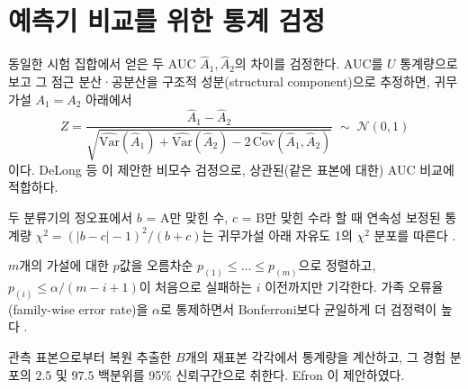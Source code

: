
\section{예측기 비교를 위한 통계 검정}
\label{sec:bg-stats}

\begin{definition}[DeLong 검정]
동일한 시험 집합에서 얻은 두 AUC $\hat{A}_1, \hat{A}_2$의 차이를 검정한다. AUC를 $U$ 통계량으로 보고 그 점근 분산·공분산을 구조적 성분(structural component)으로 추정하면, 귀무가설 $A_1 = A_2$ 아래에서
\begin{equation}
  Z = \frac{\hat{A}_1 - \hat{A}_2}{\sqrt{\widehat{\mathrm{Var}}(\hat A_1) + \widehat{\mathrm{Var}}(\hat A_2) - 2\,\widehat{\mathrm{Cov}}(\hat A_1, \hat A_2)}} \;\sim\; \mathcal{N}(0,1)
\end{equation}
이다. DeLong 등 \cite{delong1988comparing}이 제안한 비모수 검정으로, 상관된(같은 표본에 대한) AUC 비교에 적합하다.
\end{definition}

\begin{definition}[McNemar 검정]
두 분류기의 정오표에서 $b$ = A만 맞힌 수, $c$ = B만 맞힌 수라 할 때 연속성 보정된 통계량 $\chi^2 = (|b-c|-1)^2/(b+c)$는 귀무가설 아래 자유도 1의 $\chi^2$ 분포를 따른다 \cite{mcnemar1947note}.
\end{definition}

\begin{definition}
$m$개의 가설에 대한 $p$값을 오름차순 $p_{(1)} \le \dots \le p_{(m)}$으로 정렬하고, $p_{(i)} \le \alpha/(m-i+1)$이 처음으로 실패하는 $i$ 이전까지만 기각한다. 가족 오류율(family-wise error rate)을 $\alpha$로 통제하면서 Bonferroni보다 균일하게 더 검정력이 높다 \cite{holm1979simple}.
\end{definition}

\begin{definition}
관측 표본으로부터 복원 추출한 $B$개의 재표본 각각에서 통계량을 계산하고, 그 경험 분포의 $2.5$ 및 $97.5$ 백분위를 95\% 신뢰구간으로 취한다. Efron \cite{efron1979bootstrap}이 제안하였다.
\end{definition}
